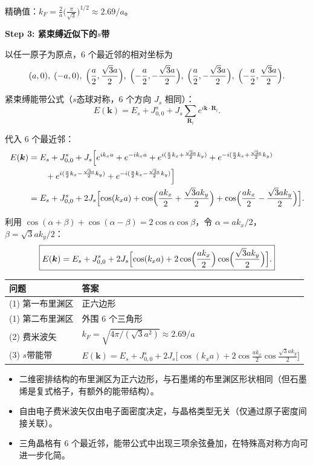\begin{derivationbox}[标准解题过程]
精确值：$k_F = \frac{2}{a}\bigl(\frac{\pi}{\sqrt{3}}\bigr)^{1/2} \approx 2.69/a$。

\textbf{Step 3: 紧束缚近似下的$s$带}

以任一原子为原点，6 个最近邻的相对坐标为
\begin{equation}
(a,0),\; (-a,0),\; \Bigl(\frac{a}{2},\frac{\sqrt{3}a}{2}\Bigr),\; \Bigl(-\frac{a}{2},-\frac{\sqrt{3}a}{2}\Bigr),\; \Bigl(\frac{a}{2},-\frac{\sqrt{3}a}{2}\Bigr),\; \Bigl(-\frac{a}{2},\frac{\sqrt{3}a}{2}\Bigr).
\end{equation}

紧束缚能带公式（$s$态球对称，6 个方向 $J_s$ 相同）：
\begin{equation}
E(\bm{k}) = E_s + J_{0,0}^{s} + J_s\sum_{\bm{R}_l}e^{i\bm{k}\cdot\bm{R}_l}.
\end{equation}

代入 6 个最近邻：
\begin{align}
E(\bm{k}) &= E_s + J_{0,0}^{s} + J_s\Bigl[e^{ik_xa} + e^{-ik_xa}
+ e^{i(\frac{a}{2}k_x + \frac{\sqrt{3}a}{2}k_y)} + e^{-i(\frac{a}{2}k_x + \frac{\sqrt{3}a}{2}k_y)} \notag\\
&\qquad + e^{i(\frac{a}{2}k_x - \frac{\sqrt{3}a}{2}k_y)} + e^{-i(\frac{a}{2}k_x - \frac{\sqrt{3}a}{2}k_y)}\Bigr] \notag\\
&= E_s + J_{0,0}^{s} + 2J_s\Bigl[\cos(k_xa)
+ \cos\Bigl(\frac{ak_x}{2} + \frac{\sqrt{3}ak_y}{2}\Bigr)
+ \cos\Bigl(\frac{ak_x}{2} - \frac{\sqrt{3}ak_y}{2}\Bigr)\Bigr].
\end{align}

利用 $\cos(\alpha+\beta)+\cos(\alpha-\beta)=2\cos\alpha\cos\beta$，令 $\alpha=ak_x/2$，$\beta=\sqrt{3}ak_y/2$：
\begin{equation}
\boxed{E(\bm{k}) = E_s + J_{0,0}^{s} + 2J_s\Bigl[\cos(k_xa) + 2\cos\Bigl(\frac{ak_x}{2}\Bigr)\cos\Bigl(\frac{\sqrt{3}ak_y}{2}\Bigr)\Bigr].}
\end{equation}
\end{derivationbox}

\begin{formulabox}[答案汇总]
\begin{center}
\begin{tabular}{ll}
\toprule
\textbf{问题} & \textbf{答案} \\
\midrule
(1) 第一布里渊区 & 正六边形 \\
(1) 第二布里渊区 & 外围 6 个三角形 \\
(2) 费米波矢 & $k_F = \sqrt{4\pi/(\sqrt{3}a^2)} \approx 2.69/a$ \\
(3) $s$带能带 & $E(\bm{k}) = E_s+J_{0,0}^{s}+2J_s\bigl[\cos(k_xa)+2\cos\frac{ak_x}{2}\cos\frac{\sqrt{3}ak_y}{2}\bigr]$ \\
\bottomrule
\end{tabular}
\end{center}
\end{formulabox}

\begin{insightbox}[物理图像]
\begin{itemize}
    \item 二维密排结构的布里渊区为正六边形，与石墨烯的布里渊区形状相同（但石墨烯是复式格子，有额外的能带结构）。
    \item 自由电子费米波矢仅由电子面密度决定，与晶格类型无关（仅通过原子密度间接关联）。
    \item 三角晶格有 6 个最近邻，能带公式中出现三项余弦叠加，在特殊高对称方向可进一步化简。
\end{itemize}
\end{insightbox}
